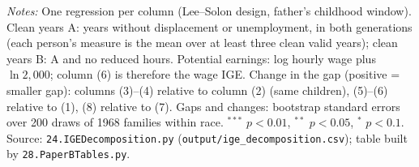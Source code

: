\begin{table}[!htbp]
{{\begin{tabular}{lcccccccc}
\bottomrule
\end{tabular}}}
\par\smallskip
\begin{minipage}{\textwidth}\footnotesize \textit{Notes:} One regression per column (Lee--Solon design, father's childhood window). Clean years A: years without displacement or unemployment, in both generations (each person's measure is the mean over at least three clean valid years); clean years B: A and no reduced hours. Potential earnings: log hourly wage plus $\ln 2{,}000$; column (6) is therefore the wage IGE. Change in the gap (positive = smaller gap): columns (3)--(4) relative to column (2) (same children), (5)--(6) relative to (1), (8) relative to (7). Gaps and changes: bootstrap standard errors over 200 draws of 1968 families within race. $^{***}$ $p<0.01$, $^{**}$ $p<0.05$, $^{*}$ $p<0.1$. Source: \texttt{24.IGEDecomposition.py} (\texttt{output/ige\_decomposition.csv}); table built by \texttt{28.PaperBTables.py}.\end{minipage}
\end{table}
